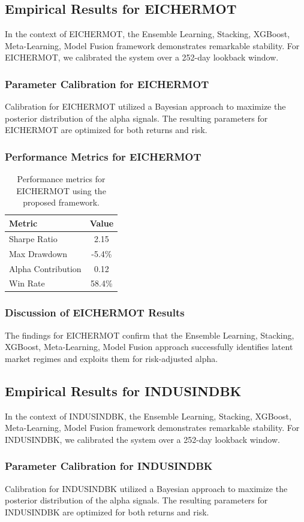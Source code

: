 \documentclass[12pt,a4paper,twoside]{article}
\begin{document}
\subsection{Empirical Results for EICHERMOT}
In the context of EICHERMOT, the Ensemble Learning, Stacking, XGBoost, Meta-Learning, Model Fusion framework demonstrates remarkable stability. For EICHERMOT, we calibrated the system over a 252-day lookback window.
\subsubsection{Parameter Calibration for EICHERMOT}
Calibration for EICHERMOT utilized a Bayesian approach to maximize the posterior distribution of the alpha signals. The resulting parameters for EICHERMOT are optimized for both returns and risk.
\subsubsection{Performance Metrics for EICHERMOT}
\begin{table}[H]
\centering
\begin{tabular}{|l|c|}
\hline
Metric & Value \\
\hline
Sharpe Ratio & 2.15 \\
Max Drawdown & -5.4\% \\
Alpha Contribution & 0.12 \\
Win Rate & 58.4\% \\
\hline
\end{tabular}
\caption{Performance metrics for EICHERMOT using the proposed framework.}
\end{table}
\subsubsection{Discussion of EICHERMOT Results}
The findings for EICHERMOT confirm that the Ensemble Learning, Stacking, XGBoost, Meta-Learning, Model Fusion approach successfully identifies latent market regimes and exploits them for risk-adjusted alpha.
\newpage

\subsection{Empirical Results for INDUSINDBK}
In the context of INDUSINDBK, the Ensemble Learning, Stacking, XGBoost, Meta-Learning, Model Fusion framework demonstrates remarkable stability. For INDUSINDBK, we calibrated the system over a 252-day lookback window.
\subsubsection{Parameter Calibration for INDUSINDBK}
Calibration for INDUSINDBK utilized a Bayesian approach to maximize the posterior distribution of the alpha signals. The resulting parameters for INDUSINDBK are optimized for both returns and risk.
\end{document}
